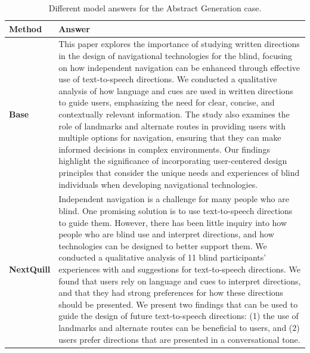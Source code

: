 \documentclass{article} %
\begin{document}
\begin{table}[t]
\centering
\scriptsize
\caption{Different model answers for the Abstract Generation case.}
\label{tab:case_abstract_answers}
\begin{tabular}{p{}p{}}
\toprule
\textbf{Method} & \textbf{Answer} \\
\midrule
\textbf{Base}
&
This paper explores the importance of studying written directions in the design of navigational technologies for the blind, focusing on how independent navigation can be enhanced through effective use of text-to-speech directions. We conducted a qualitative analysis of how language and cues are used in written directions to guide users, emphasizing the need for clear, concise, and contextually relevant information. The study also examines the role of landmarks and alternate routes in providing users with multiple options for navigation, ensuring that they can make informed decisions in complex environments. Our findings highlight the significance of incorporating user-centered design principles that consider the unique needs and experiences of blind individuals when developing navigational technologies. \\[2mm]

\textbf{NextQuill}
&
Independent navigation is a challenge for many people who are blind. One promising solution is to use text-to-speech directions to guide them. However, there has been little inquiry into how people who are blind use and interpret directions, and how technologies can be designed to better support them. We conducted a qualitative analysis of 11 blind participants' experiences with and suggestions for text-to-speech directions. We found that users rely on language and cues to interpret directions, and that they had strong preferences for how these directions should be presented. We present two findings that can be used to guide the design of future text-to-speech directions: (1) the use of landmarks and alternate routes can be beneficial to users, and (2) users prefer directions that are presented in a conversational tone. \\[2mm]


\end{tabular}
\end{table}
\end{document}
